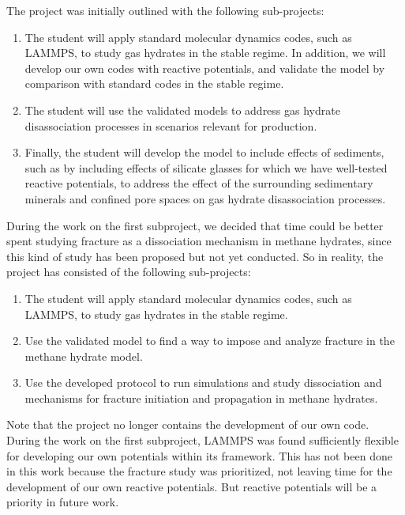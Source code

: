 The project was initially outlined with the following sub-projects:
\begin{enumerate}
\item {}
The student will apply standard molecular dynamics codes, such as LAMMPS,
to study gas hydrates in the stable regime. In addition, we will develop our
own codes with reactive potentials, and validate the model by comparison with
standard codes in the stable regime.
\item {}
The student will use the validated models to address gas hydrate disassociation
processes in scenarios relevant for production.
\item {}
Finally, the student will develop the model to include effects of sediments, such
as by including effects of silicate glasses for which we have well-tested reactive
potentials, to address the effect of the surrounding sedimentary minerals and
confined pore spaces on gas hydrate disassociation processes.
\end{enumerate}

During the work on the first subproject, we decided that time could be better spent studying fracture as a dissociation mechanism in methane hydrates, since this kind of study has been proposed but not yet conducted. So in reality, the project has consisted of the following sub-projects:

\begin{enumerate}
\item {}
The student will apply standard molecular dynamics codes, such as LAMMPS,
to study gas hydrates in the stable regime.
\item {}
Use the validated model to find a way to impose and analyze fracture in the methane hydrate model. 
\item {}
Use the developed protocol to run simulations and study dissociation and mechanisms for fracture initiation and propagation in methane hydrates.
\end{enumerate}

Note that the project no longer contains the development of our own code. During the work on the first subproject, LAMMPS was found sufficiently flexible for developing our own potentials within its framework. This has not been done in this work because the fracture study was prioritized, not leaving time for the development of our own reactive potentials. But reactive potentials will be a priority in future work.

